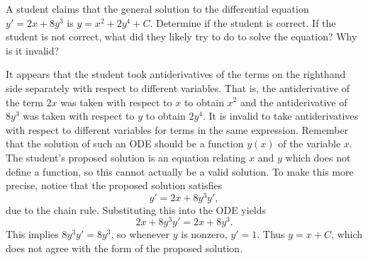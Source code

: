 \documentclass[]{ximera}
\begin{document}
\begin{problem} 

A student claims that the  general solution to the differential equation $y' = 2x+8y^3$ is $y=x^2+2y^4+C$. Determine if the student is correct.  If the student is not correct, what did they likely try to do to solve the equation?  Why is it invalid?


\begin{solution}
It appears that the student took antiderivatives of the terms on the righthand side separately with respect to different variables. That is, the antiderivative of the term $2x$ was taken with respect to $x$ to obtain $x^2$ and the antiderivative of $8y^3$ was taken with respect to $y$ to obtain $2y^4$. It is invalid to take antiderivatives with respect to different variables for terms in the same expression. Remember that the solution of such an ODE should be a function $y(x)$ of the variable $x$. The student's proposed solution is an equation relating $x$ and $y$ which does not define a function, so this cannot actually be a valid solution. To make this more precise, notice that the proposed solution satisfies
$$
y' = 2x + 8y^3 y',
$$
due to the chain rule. Substituting this into the ODE yields
$$
2x + 8y^3 y' = 2x + 8y^3.
$$
This implies $8y^3 y' = 8y^3$, so whenever $y$ is nonzero, $y'=1$. Thus $y = x + C$, which does not agree with the form of the proposed solution.

\end{solution}
\end{problem}

 
\end{document}
